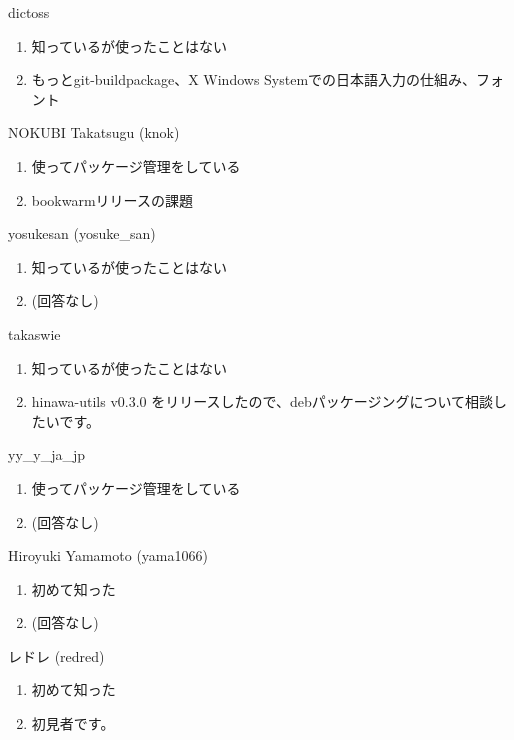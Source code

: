 \begin{prework}{ dictoss }
  \begin{enumerate}
  \item 知っているが使ったことはない
  \item もっとgit-buildpackage、X Windows Systemでの日本語入力の仕組み、フォント
  \end{enumerate}
\end{prework}

\begin{prework}{ NOKUBI Takatsugu (knok) }
  \begin{enumerate}
  \item 使ってパッケージ管理をしている
  \item bookwarmリリースの課題
  \end{enumerate}
\end{prework}

\begin{prework}{ yosukesan (yosuke\_san) }
  \begin{enumerate}
  \item 知っているが使ったことはない
  \item (回答なし)
  \end{enumerate}
\end{prework}

\begin{prework}{ takaswie }
  \begin{enumerate}
  \item 知っているが使ったことはない
  \item hinawa-utils v0.3.0 をリリースしたので、debパッケージングについて相談したいです。
  \end{enumerate}
\end{prework}

\begin{prework}{ yy\_y\_ja\_jp }
  \begin{enumerate}
  \item 使ってパッケージ管理をしている
  \item (回答なし)
  \end{enumerate}
\end{prework}

\begin{prework}{ Hiroyuki Yamamoto (yama1066) }
  \begin{enumerate}
  \item 初めて知った
  \item (回答なし)
  \end{enumerate}
\end{prework}

\begin{prework}{ レドレ (redred) }
  \begin{enumerate}
  \item 初めて知った
  \item 初見者です。
  \end{enumerate}
\end{prework}
